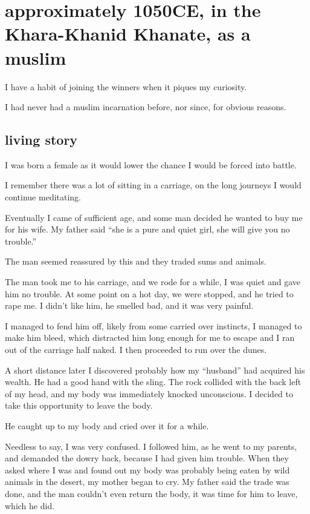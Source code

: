 \chapter{approximately 1050CE, in the Khara-Khanid Khanate, as a muslim}
\label{reincarnation:muslim}
I have a habit of joining the winners when it piques my curiosity. 

I had never had a muslim incarnation before, nor since, for obvious reasons.

\section{living story}
I was born a female as it would lower the chance I would be forced into battle. 

I remember there was a lot of sitting in a carriage, on the long journeys I 
would continue meditating. 

Eventually I came of sufficient age, and some man decided he wanted to buy me
for his wife. My father said ``she is a pure and quiet girl, she will give you no
trouble.''

The man seemed reassured by this and they traded sums and animals.

The man took me to his carriage, and we rode for a while, I was quiet and gave
him no trouble. At some point on a hot day, we were stopped, and he tried to 
rape me. I didn't like him, he smelled bad, and it was very painful. 

I managed to fend him off, likely from some carried over instincts, I managed to
make him bleed, which distracted him long enough for me to escape and I ran out 
of the carriage half naked. I then proceeded to run over the dunes. 

A short distance later I discovered probably how my ``husband'' had acquired his
wealth. He had a good hand with the sling. The rock collided with the back left
of my head, and my body was immediately knocked unconscious. I decided to take
this opportunity to leave the body.

He caught up to my body and cried over it for a while.

Needless to say, I was very confused. I followed him, as he went to my parents,
and demanded the dowry back, because I had given him trouble. When they asked
where I was and found out my body was probably being eaten by wild animals in
the desert, my mother began to cry. My father said the trade was done, and the
man couldn't even return the body, it was time for him to leave, which he did.

